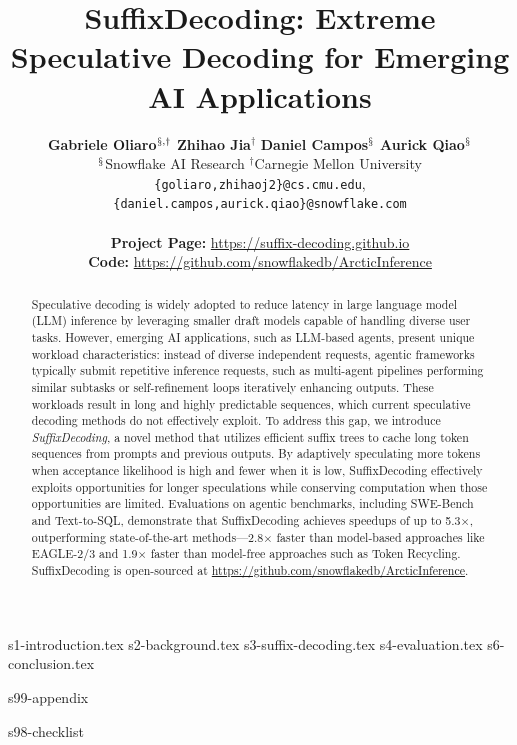 \documentclass{article}
\title{SuffixDecoding: Extreme Speculative Decoding for Emerging AI Applications}
\author{
  \textbf{Gabriele Oliaro}$^{\mathsection,\dag}$
  \quad
  \textbf{Zhihao Jia}$^{\dag}$
  \quad
  \textbf{Daniel Campos}$^{\mathsection}$
  \quad
  \textbf{Aurick Qiao}$^{\mathsection}$
  \\
  ${}^\mathsection$Snowflake AI Research \quad 
  ${}^\dag$Carnegie Mellon University\\
    \texttt{\{goliaro,zhihaoj2\}@cs.cmu.edu}, \\ 
    \texttt{\{daniel.campos,aurick.qiao\}@snowflake.com}\\\\
    \faHome \textbf{ Project Page: }\url{https://suffix-decoding.github.io}\\
    \faGithub \textbf{ Code: }\url{https://github.com/snowflakedb/ArcticInference}
}
\begin{document}
\maketitle


\begin{abstract}
Speculative decoding is widely adopted to reduce latency in large language model (LLM) inference by leveraging smaller draft models capable of handling diverse user tasks. However, emerging AI applications, such as LLM-based agents, present unique workload characteristics: instead of diverse independent requests, agentic frameworks typically submit repetitive inference requests, such as multi-agent pipelines performing similar subtasks or self-refinement loops iteratively enhancing outputs. These workloads result in long and highly predictable sequences, which current speculative decoding methods do not effectively exploit. To address this gap, we introduce \emph{SuffixDecoding}, a novel method that utilizes efficient suffix trees to cache long token sequences from prompts and previous outputs. By adaptively speculating more tokens when acceptance likelihood is high and fewer when it is low, SuffixDecoding effectively exploits opportunities for longer speculations while conserving computation when those opportunities are limited. Evaluations on agentic benchmarks, including SWE-Bench and Text-to-SQL, demonstrate that SuffixDecoding achieves speedups of up to 5.3$\times$, outperforming state-of-the-art methods---2.8$\times$ faster than model-based approaches like EAGLE-2/3 and 1.9$\times$ faster than model-free approaches such as Token Recycling. SuffixDecoding is open-sourced at \url{https://github.com/snowflakedb/ArcticInference}.
\end{abstract}

{s1-introduction.tex}
{s2-background.tex}
{s3-suffix-decoding.tex}
{s4-evaluation.tex}
{s6-conclusion.tex}


{
\small


}


\newpage
\appendix
{s99-appendix}


\newpage

{s98-checklist}

\end{document}
